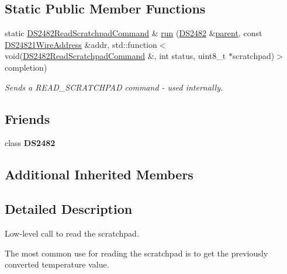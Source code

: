 \subsection*{Static Public Member Functions}
\begin{DoxyCompactItemize}
\item 
\mbox{\label{class_d_s2482_read_scratchpad_command_a863d13d919605916ed21fd7f7ead9d2a}} 
static \mbox{\hyperlink{class_d_s2482_read_scratchpad_command}{D\+S2482\+Read\+Scratchpad\+Command}} \& \mbox{\hyperlink{class_d_s2482_read_scratchpad_command_a863d13d919605916ed21fd7f7ead9d2a}{run}} (\mbox{\hyperlink{class_d_s2482}{D\+S2482}} \&\mbox{\hyperlink{class_d_s2482_command_a54a41fb8a610ef2077f5e5377771aaf3}{parent}}, const \mbox{\hyperlink{class_d_s24821_wire_address}{D\+S24821\+Wire\+Address}} \&addr, std\+::function$<$ void(\mbox{\hyperlink{class_d_s2482_read_scratchpad_command}{D\+S2482\+Read\+Scratchpad\+Command}} \&, int status, uint8\+\_\+t $\ast$scratchpad)$>$ completion)
\begin{DoxyCompactList}\small\item\em Sends a R\+E\+A\+D\+\_\+\+S\+C\+R\+A\+T\+C\+H\+P\+AD command -\/ used internally. \end{DoxyCompactList}\end{DoxyCompactItemize}
\subsection*{Friends}
\begin{DoxyCompactItemize}
\item 
\mbox{\label{class_d_s2482_read_scratchpad_command_afeaf69274324e8dbeebede05c02d9c18}} 
class {\bfseries D\+S2482}
\end{DoxyCompactItemize}
\subsection*{Additional Inherited Members}


\subsection{Detailed Description}
Low-\/level call to read the scratchpad. 

The most common use for reading the scratchpad is to get the previously converted temperature value.

